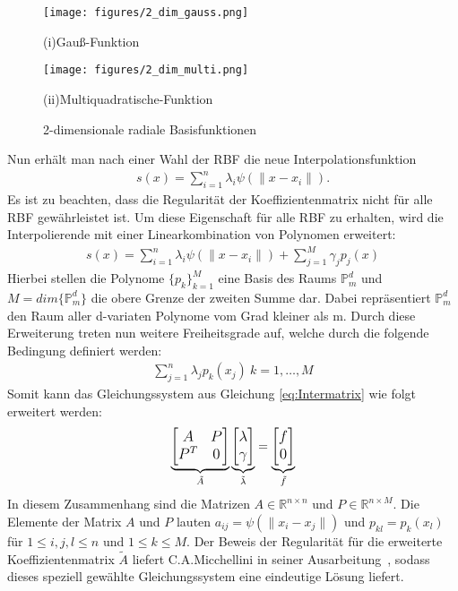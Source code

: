 \documentclass[12pt,titlepage]{article}
\begin{document}
\begin{figure}[H]
	\centering
\hspace{-1.5cm}
\begin{minipage}{0.45\textwidth}
	\texttt{[image: figures/2\_dim\_gauss.png]}
	\caption*{(i)Gauß-Funktion}
\end{minipage}
\hspace{0.6cm}
\begin{minipage}{0.45\textwidth}
	\texttt{[image: figures/2\_dim\_multi.png]}
	\caption*{(ii)Multiquadratische-Funktion}
\end{minipage}
	\caption{2-dimensionale radiale Basisfunktionen}
	\label{fig:RBF_2dim}
\end{figure}
\noindent
Nun erhält man nach einer Wahl der RBF die neue Interpolationsfunktion
\begin{align}
 s(x)=\sum_{i=1}^n\lambda_i\psi(\|x-x_i\|).\nonumber
\end{align}
Es ist zu beachten, dass die Regularität der Koeffizientenmatrix nicht für alle RBF gewährleistet ist. Um diese Eigenschaft für alle RBF zu erhalten, wird die Interpolierende mit einer Linearkombination von Polynomen erweitert:
\begin{align}
 s(x)=\sum_{i=1}^n\lambda_i\psi(\|x-x_i\|)+\sum_{j=1}^M\gamma_jp_j(x)\nonumber
\end{align}
Hierbei stellen die Polynome $\{p_k\}_{k=1}^M$ eine Basis des Raums $\mathbb{P}_m^d$ und $M=dim\{\mathbb{P}_m^d\}$ die obere Grenze der zweiten Summe dar. Dabei repräsentiert $\mathbb{P}_m^d$ den Raum aller d-variaten Polynome vom Grad kleiner als m. Durch diese Erweiterung treten nun weitere Freiheitsgrade auf, welche durch die folgende Bedingung definiert werden:
\begin{align}
 \sum_{j=1}^n\lambda_jp_k(x_j)~k=1,\dots,M\nonumber
\end{align}
Somit kann das Gleichungssystem aus Gleichung \eqref{eq:Intermatrix} wie folgt erweitert werden:
\begin{align}
{\large
\underbrace{\begin{bmatrix}
 A & P \\ P^T & 0
\end{bmatrix}}_{\tilde A}
\underbrace{\begin{bmatrix}
 \lambda  \\ \gamma
\end{bmatrix}}_{\tilde\lambda}
=
\underbrace{\begin{bmatrix}
 f  \\ 0
\end{bmatrix}}_{\tilde f}}\nonumber
\end{align}
In diesem Zusammenhang sind die Matrizen $A\in\mathbb{R}^{n\times n}$ und $P\in\mathbb{R}^{n\times M}$. Die Elemente der Matrix $A$ und $P$ lauten $a_{ij}=\psi(\|x_i-x_j\|)$ und $p_{kl}=p_k(x_l)$ für $1\le i,j,l\le n$ und $1\le k\le M$. Der Beweis der Regularität für die erweiterte Koeffizientenmatrix $\tilde A$ liefert C.A.Micchellini in seiner Ausarbeitung~\cite{micchelli1984interpolation}, sodass dieses speziell gewählte Gleichungssystem eine eindeutige Lösung liefert.
\end{document}
